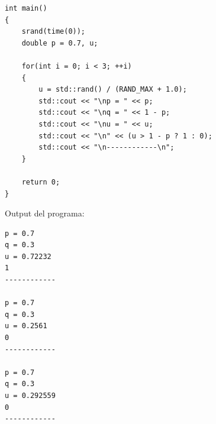 \documentclass[a4paper, 12pt]{article}
\begin{document}
\begin{enumerate}
{\begin{lstlisting}
int main()
{
    srand(time(0));
    double p = 0.7, u;

    for(int i = 0; i < 3; ++i)
    {
        u = std::rand() / (RAND_MAX + 1.0);
        std::cout << "\np = " << p;
        std::cout << "\nq = " << 1 - p;
        std::cout << "\nu = " << u;
        std::cout << "\n" << (u > 1 - p ? 1 : 0);
        std::cout << "\n------------\n";
    }

    return 0;
}
\end{lstlisting}

\Large Output del programa:
\begin{lstlisting}
p = 0.7
q = 0.3
u = 0.72232
1
------------

p = 0.7
q = 0.3
u = 0.2561
0
------------

p = 0.7
q = 0.3
u = 0.292559
0
------------
\end{lstlisting}
}
    \end{enumerate}
\end{document}
